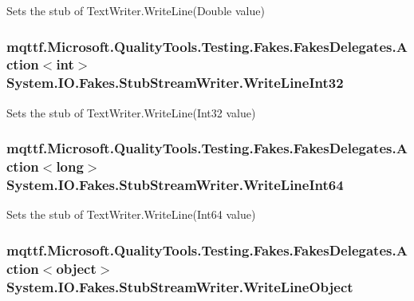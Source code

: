 Sets the stub of Text\-Writer.\-Write\-Line(\-Double value)

\hypertarget{class_system_1_1_i_o_1_1_fakes_1_1_stub_stream_writer_aa1aef5e4e1f1328bf7a2816d1a9d4c5a}{
\subsubsection[{Write\-Line\-Int32}]{\setlength{\rightskip}{0pt plus 5cm}mqttf.\-Microsoft.\-Quality\-Tools.\-Testing.\-Fakes.\-Fakes\-Delegates.\-Action$<$int$>$ System.\-I\-O.\-Fakes.\-Stub\-Stream\-Writer.\-Write\-Line\-Int32}}\label{class_system_1_1_i_o_1_1_fakes_1_1_stub_stream_writer_aa1aef5e4e1f1328bf7a2816d1a9d4c5a}


Sets the stub of Text\-Writer.\-Write\-Line(\-Int32 value)

\hypertarget{class_system_1_1_i_o_1_1_fakes_1_1_stub_stream_writer_a242ea063122d52c9885131e4d77fe825}{
\subsubsection[{Write\-Line\-Int64}]{\setlength{\rightskip}{0pt plus 5cm}mqttf.\-Microsoft.\-Quality\-Tools.\-Testing.\-Fakes.\-Fakes\-Delegates.\-Action$<$long$>$ System.\-I\-O.\-Fakes.\-Stub\-Stream\-Writer.\-Write\-Line\-Int64}}\label{class_system_1_1_i_o_1_1_fakes_1_1_stub_stream_writer_a242ea063122d52c9885131e4d77fe825}


Sets the stub of Text\-Writer.\-Write\-Line(\-Int64 value)

\hypertarget{class_system_1_1_i_o_1_1_fakes_1_1_stub_stream_writer_a211c495492cad47f639a77817d754e0b}{
\subsubsection[{Write\-Line\-Object}]{\setlength{\rightskip}{0pt plus 5cm}mqttf.\-Microsoft.\-Quality\-Tools.\-Testing.\-Fakes.\-Fakes\-Delegates.\-Action$<$object$>$ System.\-I\-O.\-Fakes.\-Stub\-Stream\-Writer.\-Write\-Line\-Object}}\label{class_system_1_1_i_o_1_1_fakes_1_1_stub_stream_writer_a211c495492cad47f639a77817d754e0b}


